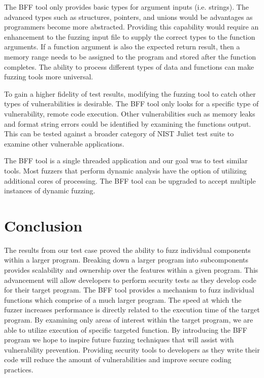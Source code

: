 \documentclass[conference]{IEEEtran}
\begin{document}
The BFF tool only provides basic types for argument inputs (i.e. strings). The advanced types such as structures, pointers, and unions would be advantages as programmers become more abstracted. Providing this capability would require an enhancement to the fuzzing input file to supply the correct types to the function arguments. If a function argument is also the expected return result, then a memory range needs to be assigned to the program and stored after the function completes. The ability to process different types of data and functions can make fuzzing tools more universal. 

To gain a higher fidelity of test results, modifying the fuzzing tool to catch other types of vulnerabilities is desirable. The BFF tool only looks for a specific type of vulnerability, remote code execution. Other vulnerabilities such as memory leaks and format string errors could be identified by examining the functions output. This can be tested against a broader category of NIST Juliet test suite to examine other vulnerable applications. 

The BFF tool is a single threaded application and our goal was to test similar tools. Most fuzzers that perform dynamic analysis have the option of utilizing additional cores of processing. The BFF tool can be upgraded to accept multiple instances of dynamic fuzzing. 

\section{Conclusion}
The results from our test case proved the ability to fuzz individual components within a larger program. Breaking down a larger program into subcomponents provides scalability and ownership over the features within a given program. This advancement will allow developers to perform security tests as they develop code for their target program. The BFF tool provides a mechanism to fuzz individual functions which comprise of a much larger program. The speed at which the fuzzer increases performance is directly related to the execution time of the target program. By examining only areas of interest within the target program, we are able to utilize execution of specific targeted function. By introducing the BFF program we hope to inspire future fuzzing techniques that will assist with vulnerability prevention. Providing security tools to developers as they write their code will reduce the amount of vulnerabilities and improve secure coding practices. 

\nocite{*}


\end{document}
